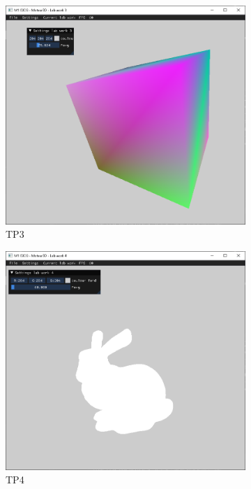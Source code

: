 \documentclass[10pt,a4paper]{article}
\begin{document}
\begin{figure}[!ht]
				\hfill
				\begin{subfigure}[b]{0.32\textwidth}
					\centering
					\includegraphics[width=.9\textwidth]{figures/TP3.png}
					\caption{TP3}\label{fig:TP3}
				\end{subfigure}
				\hfill
				\begin{subfigure}[b]{0.32\textwidth}
					\centering
					\includegraphics[width=.9\textwidth]{figures/TP4.png}
					\caption{TP4}\label{fig:TP4}
				\end{subfigure}
				\hfill
				\begin{subfigure}[b]{0.32\textwidth}

\end{subfigure}
\end{figure}
\end{document}
